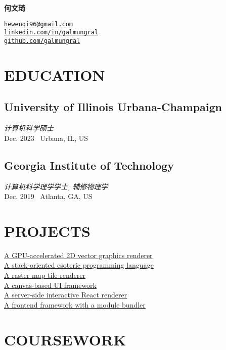 \documentclass[11pt,twocolumn]{article}
\begin{document}
{\Huge\bf 何文琦}

\vspace{10pt}
\href{mailto:hewenqi96@gmail.com}{\texttt{hewenqi96@gmail.com}}\\
\href{https://linkedin.com/in/galmungral}{\texttt{linkedin.com/in/galmungral}}\\
\href{https://github.com/galmungral}{\texttt{github.com/galmungral}}


\section*{\textnormal{EDUCATION}}

\subsection*{University of Illinois Urbana-Champaign}
\textit{计算机科学硕士}\\
Dec. 2023 \textbullet\ Urbana, IL, US

\subsection*{Georgia Institute of Technology}
\textit{计算机科学理学学士, 辅修物理学}\\
Dec. 2019 \textbullet\ Atlanta, GA, US

\section*{\textnormal{PROJECTS}}
\href{https://github.com/galmungral/polyrender}{A GPU-accelerated 2D vector graphics renderer}\\
\href{https://github.com/galmungral/hanbun-lang}{A stack-oriented esoteric programming language} \\
\href{https://github.com/galmungral/mercator}{A raster map tile renderer}\\
\href{https://github.com/galmungral/michelangelo}{A canvas-based UI framework}\\
\href{https://github.com/galmungral/react-teletype}{A server-side interactive React renderer} \\
\href{https://github.com/galmungral/replay}{A frontend framework with a module bundler}

\section*{\textnormal{COURSEWORK}}
\end{document}
